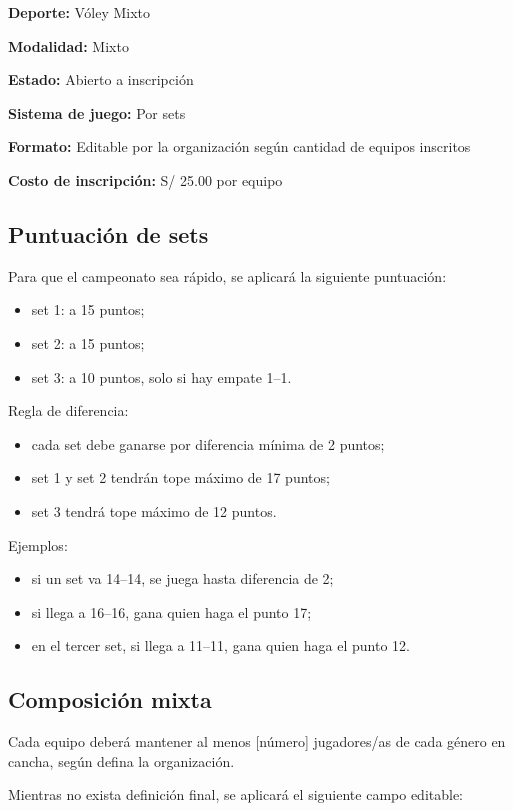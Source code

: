 \documentclass[12pt,a4paper]{article}
\newcommand{\dato}[2]{\noindent\textbf{#1:} #2\par\vspace{0.25em}}
\begin{document}
\dato{Deporte}{Vóley Mixto}
\dato{Modalidad}{Mixto}
\dato{Estado}{Abierto a inscripción}
\dato{Sistema de juego}{Por sets}
\dato{Formato}{Editable por la organización según cantidad de equipos inscritos}
\dato{Costo de inscripción}{S/ 25.00 por equipo}

\subsection{Puntuación de sets}

Para que el campeonato sea rápido, se aplicará la siguiente puntuación:

\begin{itemize}
  \item set 1: a 15 puntos;
  \item set 2: a 15 puntos;
  \item set 3: a 10 puntos, solo si hay empate 1--1.
\end{itemize}

Regla de diferencia:

\begin{itemize}
  \item cada set debe ganarse por diferencia mínima de 2 puntos;
  \item set 1 y set 2 tendrán tope máximo de 17 puntos;
  \item set 3 tendrá tope máximo de 12 puntos.
\end{itemize}

Ejemplos:

\begin{itemize}
  \item si un set va 14--14, se juega hasta diferencia de 2;
  \item si llega a 16--16, gana quien haga el punto 17;
  \item en el tercer set, si llega a 11--11, gana quien haga el punto 12.
\end{itemize}

\subsection{Composición mixta}

Cada equipo deberá mantener al menos [número] jugadores/as de cada género en cancha, según defina la organización.

Mientras no exista definición final, se aplicará el siguiente campo editable:

\begin{center}
\end{center}
\end{document}
